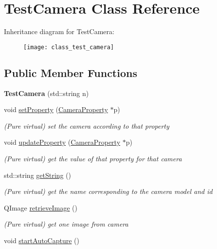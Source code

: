 \hypertarget{class_test_camera}{\section{Test\-Camera Class Reference}
\label{class_test_camera}
}
Inheritance diagram for Test\-Camera\-:\begin{figure}[H]
\begin{center}
\leavevmode
\texttt{[image: class\_test\_camera]}
\end{center}
\end{figure}
\subsection*{Public Member Functions}
\begin{DoxyCompactItemize}
\item 
\hypertarget{class_test_camera_a46fb8a67d24675886760e6fc0058edb3}{{\bfseries Test\-Camera} (std\-::string n)}\label{class_test_camera_a46fb8a67d24675886760e6fc0058edb3}

\item 
void \hyperlink{class_test_camera_a92507f0e4601f93912b06297e4b59d99}{set\-Property} (\hyperlink{class_camera_manager_1_1_camera_property}{Camera\-Property} $\ast$p)
\begin{DoxyCompactList}\small\item\em (Pure virtual) set the camera according to that property \end{DoxyCompactList}\item 
void \hyperlink{class_test_camera_a6b0c9e25baafe0a8d211b32851cb67b3}{update\-Property} (\hyperlink{class_camera_manager_1_1_camera_property}{Camera\-Property} $\ast$p)
\begin{DoxyCompactList}\small\item\em (Pure virtual) get the value of that property for that camera \end{DoxyCompactList}\item 
std\-::string \hyperlink{class_test_camera_a5ddb007a4c0c44e06b24787298f1c97c}{get\-String} ()
\begin{DoxyCompactList}\small\item\em (Pure virtual) get the name corresponding to the camera model and id \end{DoxyCompactList}\item 
Q\-Image \hyperlink{class_test_camera_a283bd75f1b9500e35ba7aa252c2df14e}{retrieve\-Image} ()
\begin{DoxyCompactList}\small\item\em (Pure virtual) get one image from camera \end{DoxyCompactList}\item 
\hypertarget{class_test_camera_a095498b65800c150009292e73f765621}{void \hyperlink{class_test_camera_a095498b65800c150009292e73f765621}{start\-Auto\-Capture} ()}\label{class_test_camera_a095498b65800c150009292e73f765621}


\end{DoxyCompactItemize}
